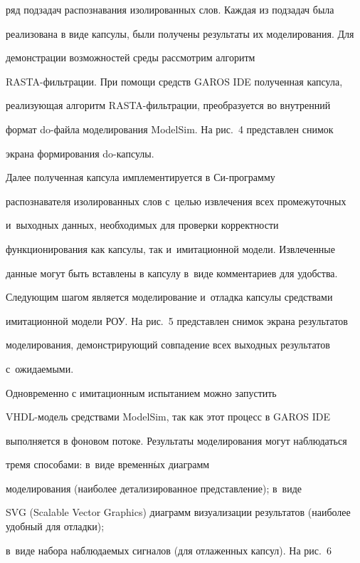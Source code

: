 ряд подзадач распознавания изолированных слов. Каждая из подзадач была 

реализована в виде капсулы, были получены результаты их моделирования. Для 

демонстрации возможностей среды рассмотрим алгоритм  

RASTA-фильт\-ра\-ции. При помощи средств GAROS IDE полученная капсула, 

реализующая алгоритм RASTA-фильт\-ра\-ции, преобразуется во внутренний 

формат do-фай\-ла моделирования ModelSim. На рис.~4 представлен снимок 

экрана формирования do-кап\-сулы.



  Далее полученная капсула имплементируется в Си-про\-грам\-му 

распознавателя изолированных слов с~целью извлечения всех промежуточных 

и~выходных данных, необходимых для проверки корректности 

функционирования как кап\-су\-лы, так и~имитационной модели. Извлеченные 

данные могут быть вставлены в капсулу в~виде комментариев для удобства. 

Следующим шагом является моделирование и~отладка капсулы средствами 

имитационной модели РОУ. На рис.~5 представлен снимок экрана результатов 

моделирования, демонстрирующий совпадение всех выходных результатов 

с~ожидаемыми.

  



  

  Одновременно с имитационным испытанием можно запустить  

VHDL-мо\-дель средствами ModelSim, так как этот процесс в GAROS IDE 

выполняется в фоновом потоке. Результаты моделирования могут наблюдаться 

тремя способами: в~виде временн$\acute{\mbox{ы}}$х диаграмм 

моделирования (наиболее детализированное представление); в~виде  

SVG (Scalable Vector Graphics) диа\-грамм визуализации результатов (наиболее удобный для отладки); 

в~виде набора наблюдаемых сигналов (для отлаженных капсул). На рис.~6 

